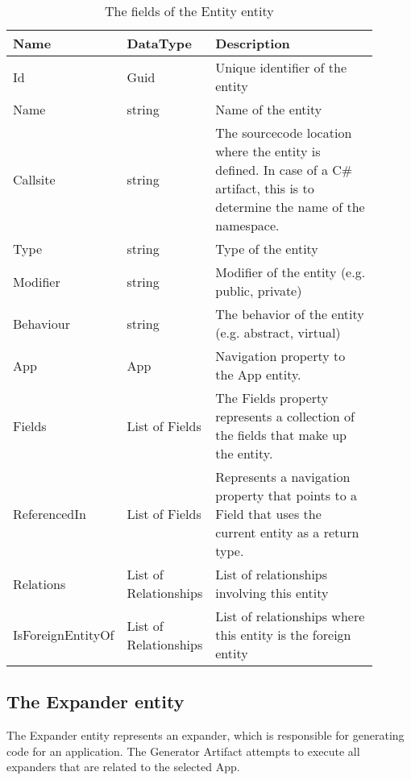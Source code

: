 \begin{table}[H]
\small
\begin{tabular}{ p{0.20\linewidth} p{0.24\linewidth} p{0.46\linewidth} }
\hline
\textbf{Name} & \textbf{DataType} & \textbf{Description} \\
\hline
Id & Guid & Unique identifier of the entity \\
Name & string & Name of the entity \\
Callsite & string & The sourcecode location where the entity is defined. In case of a C\#
artifact, this is to determine the name of the namespace.\\
Type & string & Type of the entity \\
Modifier & string & Modifier of the entity (e.g. public, private) \\
Behaviour & string & The behavior of the entity (e.g. abstract, virtual) \\
App & App & Navigation property to the App entity. \\
Fields & List of Fields & The Fields property represents a collection of the fields that
make up the entity. \\
ReferencedIn & List of Fields & Represents a navigation property that points to a Field
that uses the current entity as a return type. \\
Relations & List of Relationships & List of relationships involving this entity \\
IsForeignEntityOf & List of Relationships & List of relationships where this entity is the foreign entity \\
\hline
\end{tabular}
\caption{The fields of the Entity entity}
\label{table:entity_entity}
\end{table}

\subsection{The Expander entity}

The Expander entity represents an expander, which is responsible for generating code for
an application. The Generator Artifact attempts to execute all expanders that are related
to the selected App.

